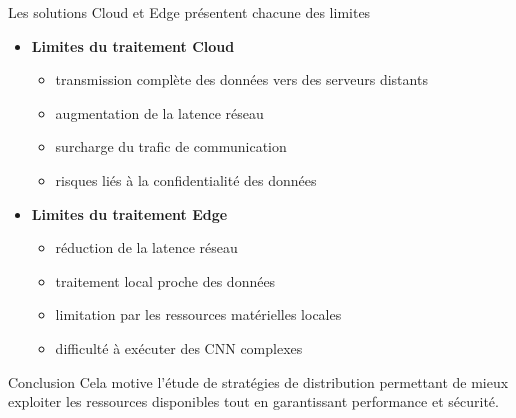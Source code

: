 \documentclass[aspectratio=169]{beamer}
\begin{document}
\begin{frame}{Les solutions Cloud et Edge présentent chacune des limites}

\begin{itemize}

    \item \textbf{Limites du traitement Cloud}
    \begin{itemize}
        \item transmission complète des données vers des serveurs distants
        \item augmentation de la latence réseau
        \item surcharge du trafic de communication
        \item risques liés à la confidentialité des données
    \end{itemize}

    \bigskip

    \item \textbf{Limites du traitement Edge}
    \begin{itemize}
        \item réduction de la latence réseau
        \item traitement local proche des données
        \item limitation par les ressources matérielles locales
        \item difficulté à exécuter des CNN complexes
    \end{itemize}

\end{itemize}

\begin{block}{Conclusion}
    Cela motive l’étude de stratégies de distribution permettant de mieux exploiter les ressources disponibles tout en garantissant performance et sécurité.
\end{block}

\end{frame}
\end{document}
